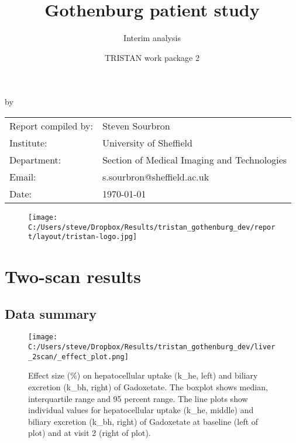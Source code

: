 \documentclass{epflreport}%
\begin{document}
%
\normalsize%
\frontmatter%
\title{Gothenburg patient study}%
\subtitle{Interim analysis}%
\author{TRISTAN work package 2}%
\subject{D2.07 {-} Internal report}%
%
%
%
\makecover%
\begin{titlepage}%
\begin{center}%
\makeatletter%
\largetitlestyle\fontsize{45}{45}\selectfont\@title%
\makeatother%
\linebreak%
\makeatletter%
\ifdefvoid{\@subtitle}{}{\bigskip\titlestyle\fontsize{20}{20}\selectfont\@subtitle}%
\makeatother%
\linebreak%
\bigskip%
\bigskip%
by%
\linebreak%
\bigskip%
\bigskip%
\makeatletter%
\largetitlestyle\fontsize{25}{25}\selectfont\@author%
\makeatother%
\vfill%
\large%
\begin{tabular}{ll}%
\hline%
Report compiled by: &Steven Sourbron\\%
Institute: &University of Sheffield\\%
Department: &Section of Medical Imaging and Technologies\\%
Email: &s.sourbron@sheffield.ac.uk\\%
Date: &\today\\%
\hline%
\end{tabular}%


\begin{figure}[b!]%
\centering%
\centering%
\texttt{[image: C:/Users/steve/Dropbox/Results/tristan\_gothenburg\_dev/report/layout/tristan-logo.jpg]}%
\end{figure}

%
\end{center}%
\end{titlepage}%
\newpage%
\tableofcontents%
\mainmatter%
\clearpage%
\chapter{Two{-}scan results}%
\section{Data summary}%
\label{sec:Datasummary}%


\begin{figure}[h!]%
\centering%
\centering%
\texttt{[image: C:/Users/steve/Dropbox/Results/tristan\_gothenburg\_dev/liver\_2scan/\_effect\_plot.png]}%
\caption{Effect size (\%) on hepatocellular uptake (k\_he, left) and biliary excretion (k\_bh, right) of Gadoxetate. The boxplot shows median, interquartile range and 95 percent range. The line plots show individual values for hepatocellular uptake (k\_he, middle) and biliary excretion (k\_bh, right) of Gadoxetate at baseline (left of plot) and at visit 2 (right of plot).}%
\end{figure}
\end{document}
